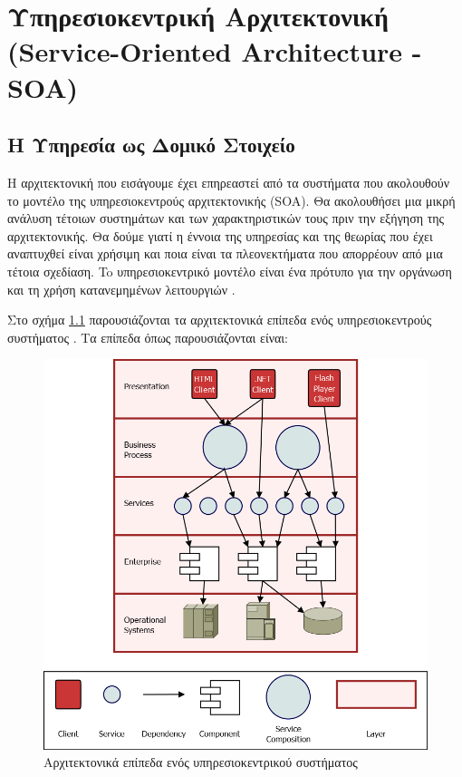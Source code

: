 \chapter[Υπηρεσιοκεντρική Αρχιτεκτονική]{Υπηρεσιοκεντρική Αρχιτεκτονική (Service-Oriented Architecture - SOA)}
\label{chap:SOA}

\section{Η Υπηρεσία ως Δομικό Στοιχείο}

Η αρχιτεκτονική που εισάγουμε έχει επηρεαστεί από τα συστήματα που 
ακολουθούν το μοντέλο της υπηρεσιοκεντρούς αρχιτεκτονικής (SOA). Θα 
ακολουθήσει μια μικρή ανάλυση τέτοιων συστημάτων και των χαρακτηριστικών 
τους πριν την εξήγηση της αρχιτεκτονικής. Θα δούμε γιατί η έννοια της 
υπηρεσίας και της θεωρίας που έχει αναπτυχθεί είναι χρήσιμη και ποια 
είναι τα πλεονεκτήματα που απορρέουν από μια τέτοια σχεδίαση. To 
υπηρεσιοκεντρικό μοντέλο είναι ένα πρότυπο για την οργάνωση και τη χρήση 
κατανεμημένων λειτουργιών \citep{OASIS-soa-rm}. 

Στο σχήμα \ref{fig:SOA_layers} παρουσιάζονται τα αρχιτεκτονικά επίπεδα ενός 
υπηρεσιοκεντρούς συστήματος \citep{Bianco2011}. Τα επίπεδα όπως παρουσιάζονται είναι:

\begin{figure}[htbp]
  \begin{center}
    \includegraphics[scale=0.3]{Figures/SOA/SOA_layers.png}
  \end{center}
  \caption{Αρχιτεκτονικά επίπεδα ενός υπηρεσιοκεντρικού συστήματος}
  \label{fig:SOA_layers}
\end{figure}

